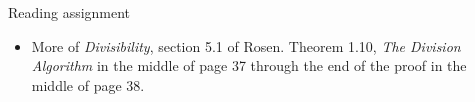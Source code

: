 \documentclass[handout]{beamer}
\begin{document}
\begin{frame}{Reading assignment}

\begin{itemize}
  \item More of \emph{Divisibility}, section 5.1 of Rosen. Theorem 1.10,
  \emph{The Division Algorithm} in the middle of page 37 through the end of the
  proof in the middle of page 38.
\end{itemize}

\end{frame}
\end{document}
